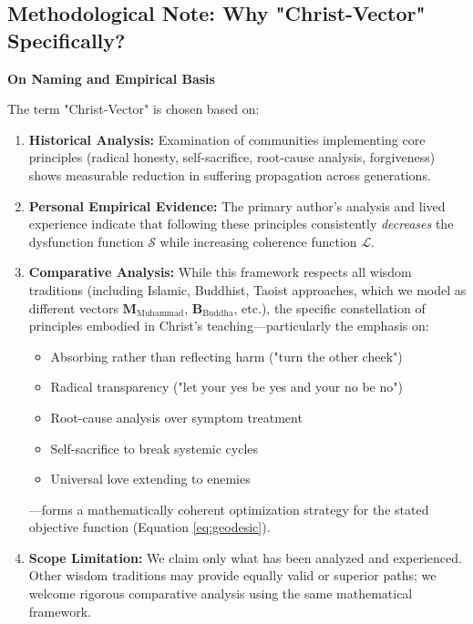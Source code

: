 \documentclass[11pt,a4paper]{article}
\theoremstyle{definition}
\theoremstyle{remark}
\begin{document}

\subsection{Methodological Note: Why "Christ-Vector" Specifically?}

\begin{mdframed}[backgroundcolor=blue!5]
\textbf{On Naming and Empirical Basis}

The term "Christ-Vector" is chosen based on:

\begin{enumerate}
\item \textbf{Historical Analysis:} Examination of communities implementing core principles (radical honesty, self-sacrifice, root-cause analysis, forgiveness) shows measurable reduction in suffering propagation across generations.

\item \textbf{Personal Empirical Evidence:} The primary author's analysis and lived experience indicate that following these principles consistently \textit{decreases} the dysfunction function $\mathcal{S}$ while increasing coherence function $\mathcal{L}$.

\item \textbf{Comparative Analysis:} While this framework respects all wisdom traditions (including Islamic, Buddhist, Taoist approaches, which we model as different vectors $\mathbf{M}_{\text{Muhammad}}$, $\mathbf{B}_{\text{Buddha}}$, etc.), the specific constellation of principles embodied in Christ's teaching—particularly the emphasis on:
\begin{itemize}
\item Absorbing rather than reflecting harm ("turn the other cheek")
\item Radical transparency ("let your yes be yes and your no be no")  
\item Root-cause analysis over symptom treatment
\item Self-sacrifice to break systemic cycles
\item Universal love extending to enemies
\end{itemize}
—forms a mathematically coherent optimization strategy for the stated objective function (Equation \ref{eq:geodesic}).

\item \textbf{Scope Limitation:} We claim only what has been analyzed and experienced. Other wisdom traditions may provide equally valid or superior paths; we welcome rigorous comparative analysis using the same mathematical framework.


\end{enumerate}
\end{mdframed}
\end{document}

